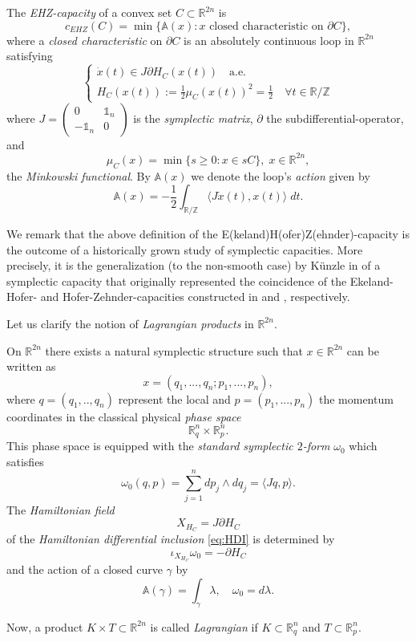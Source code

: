 \documentclass[12pt]{amsart}
\theoremstyle{plain}
\theoremstyle{remark}
\theoremstyle{definition}
\newcommand{\R}{\mathbb{R}}
\newcommand{\Z}{\mathbb{Z}}
\newcommand{\A}{\mathbb{A}}
\def\beq{\begin{equation}}\def\eeq{\end{equation}}
\def\beqq{\begin{equation*}}\def\eeqq{\end{equation*}}
\begin{document}
The \textit{EHZ-capacity} of a convex set $C\subset\R^{2n}$ is
\beqq c_{EHZ}(C)=\min\{\A(x):x \text{ closed characteristic on }\partial C\},\eeqq
where a \textit{closed characteristic} on $\partial C$ is an absolutely continuous loop in $\R^{2n}$ satisfying
\beq \begin{cases}\dot{x}(t)\in J\partial H_{C}(x(t))\quad \text{a.e.} \\ H_{C}(x(t)):=\frac{1}{2}\mu_{C}(x(t))^2=\frac{1}{2}\quad\forall t\in \R/\Z\end{cases}\label{eq:HDI}\eeq
where $J=\begin{pmatrix} 0 & \mathbb{1}_n \\ -\mathbb{1}_n & 0 \end{pmatrix}$ is the \textit{symplectic matrix}, $\partial$ the subdifferential-operator, and
\beqq \mu_C(x)=\min\{s\geq 0 : x \in sC\}, \; x\in\R^{2n},\eeqq
the \textit{Minkowski functional}. By $\A(x)$ we denote the loop's \textit{action} given by
\beqq \A(x)= -\frac{1}{2}\int_{\R/\Z} \langle J\dot{x}(t),x(t)\rangle \;dt.\eeqq

We remark that the above definition of the E(keland)H(ofer)Z(ehnder)-capacity is the outcome of a historically grown study of symplectic capacities. More precisely, it is the generalization (to the non-smooth case) by K\"{u}nzle in \cite{Kuenzle1996} of a symplectic capacity that originally represented the coincidence of the Ekeland-Hofer- and Hofer-Zehnder-capacities constructed in \cite{EkHo1989} and \cite{HoferZehnder1990}, respectively.

Let us clarify the notion of \textit{Lagrangian products} in $\R^{2n}$.

On $\R^{2n}$ there exists a natural symplectic structure such that $x\in\R^{2n}$ can be written as
\beqq x=(q_1,...,q_n;p_1,...,p_n),\eeqq
where $q=(q_1,..,q_n)$ represent the local and $p=(p_1,...,p_n)$ the momentum coordinates in the classical physical \textit{phase space}
\beqq \R^n_q\times \R^n_p.\eeqq
This phase space is equipped with the \textit{standard symplectic $2$-form} $\omega_0$ which satisfies
\beqq \omega_0(q,p)=\sum_{j=1}^n dp_j \wedge dq_j=\langle Jq,p\rangle.\eeqq
The \textit{Hamiltonian  field}
\beqq X_{H_C}=J\partial H_C\eeqq
of the \textit{Hamiltonian differential inclusion} \eqref{eq:HDI} is determined by
\beqq \iota_{X_{H_C}}\omega_0=-\partial H_C\eeqq
and the action of a closed curve $\gamma$ by
\beqq \A(\gamma)=\int_\gamma \lambda,\quad \omega_0=d\lambda.\eeqq

Now, a product $K\times T\subset\R^{2n}$ is called \textit{Lagrangian} if $K\subset\R^n_q$ and $T\subset\R^n_p$.
\end{document}
